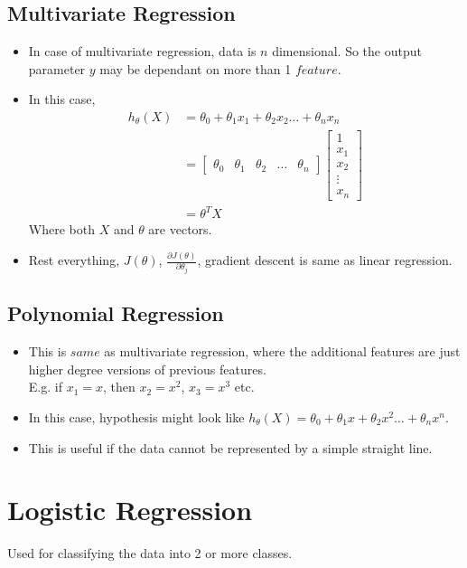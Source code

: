 \documentclass{article}
\begin{document}
\subsection{Multivariate Regression}
\begin{itemize}
	\item In case of multivariate regression, data is $n$ dimensional. So the output parameter $y$ may be dependant on more than 1 $feature$.
	\item In this case, \begin{align*}
		h_\theta(X) &= \theta_0 + \theta_1 x_1 + \theta_2 x_2 \dots +\theta_n x_n\\
		&= \begin{bmatrix}
			\theta_0 & \theta_1&\theta_2&\dots&\theta_n
		\end{bmatrix}
		\begin{bmatrix}
			1 \\x_1 \\x_2 \\\vdots \\x_n
		\end{bmatrix}
		\\
		&= \theta^T X
	\end{align*}
	Where both $X$ and $\theta$ are vectors.
	\item Rest everything, $J(\theta)$, $\frac{\partial J(\theta)}{\partial \theta_j}$, gradient descent is same as linear regression.
\end{itemize}
\subsection{Polynomial Regression}
\begin{itemize}
	\item This is $same$ as multivariate regression, where the additional features are just higher degree versions of previous features.\\
	E.g. if $x_1=x$, then $x_2 = x^2$, $x_3=x^3$ etc.
	\item In this case, hypothesis might look like $h_\theta(X) = \theta_0 + \theta_1 x + \theta_2 x^2 \dots +\theta_n x^n$.
	\item This is useful if the data cannot be represented by a simple straight line.
\end{itemize}
\section{Logistic Regression}
Used for classifying the data into 2 or more classes.
\end{document}

